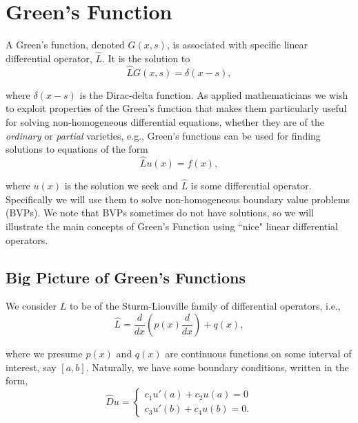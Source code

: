 \graphicspath{{./Greens_Function/}}

\section{Green's Function}

A Green's function, denoted $G(x,s)$, is associated with specific linear differential operator, $\hat{L}$. It is the solution to 
\begin{equation}
\label{Greens_Def} \hat{L}G(x,s) = \delta(x-s),
\end{equation}

where $\delta(x-s)$ is the Dirac-delta function. As applied mathematicians we wish to exploit properties of the Green's function that makes them particularly useful for solving non-homogeneous differential equations, whether they are of the \emph{ordinary} or \emph{partial} varieties, e.g., Green's functions can be used for finding solutions to equations of the form
\begin{equation}
\label{bvp_ode} \hat{L} u(x) = f(x),
\end{equation}

where $u(x)$ is the solution we seek and $\hat{L}$ is some differential operator. Specifically we will use them to solve non-homogeneous boundary value problems (BVPs). We note that BVPs sometimes do not have solutions, so we will illustrate the main concepts of Green's Function using ``nice" linear differential operators. 

\subsection{Big Picture of Green's Functions}

We consider $L$ to be of the Sturm-Liouville family of differential operators, i.e., 
\begin{equation}
\label{sturm_liouville_op} \hat{L} = \frac{d}{dx} \left( p(x) \frac{d}{dx} \right) + q(x),
\end{equation}

where we presume $p(x)$ and $q(x)$ are continuous functions on some interval of interest, say $[a,b]$. Naturally, we have some boundary conditions, written in the form,
\begin{equation}
\hat{D}u = \left\{ \begin{array}{c}
c_1 u'(a)+c_2 u(a) = 0 \\
c_3 u'(b) + c_4 u(b) = 0.
\end{array}\right.
\end{equation}

